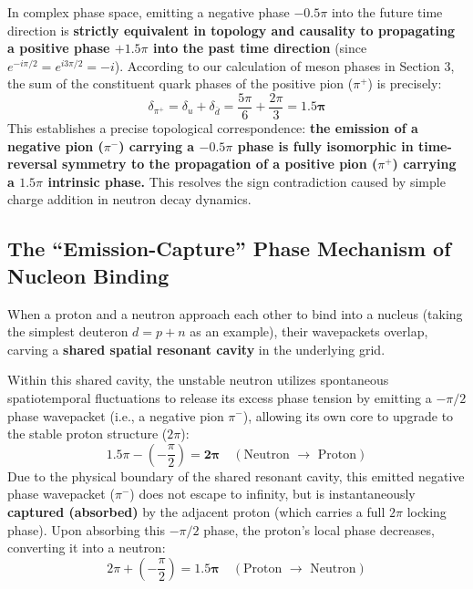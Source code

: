 \documentclass[12pt, a4paper]{article}
\begin{document}
In complex phase space, emitting a negative phase $-0.5\pi$ into the future time direction is \textbf{strictly equivalent in topology and causality to propagating a positive phase $+1.5\pi$ into the past time direction} (since $e^{-i\pi/2} = e^{i3\pi/2} = -i$). According to our calculation of meson phases in Section 3, the sum of the constituent quark phases of the positive pion ($\pi^+$) is precisely:
\begin{equation}
\delta_{\pi^+} = \delta_u + \delta_{\bar{d}} = \frac{5\pi}{6} + \frac{2\pi}{3} = \mathbf{1.5\pi} \label{eq:pion_phase_match}
\end{equation}
This establishes a precise topological correspondence: \textbf{the emission of a negative pion ($\pi^-$) carrying a $-0.5\pi$ phase is fully isomorphic in time-reversal symmetry to the propagation of a positive pion ($\pi^+$) carrying a $1.5\pi$ intrinsic phase.} This resolves the sign contradiction caused by simple charge addition in neutron decay dynamics.

\subsection{The ``Emission-Capture'' Phase Mechanism of Nucleon Binding}

When a proton and a neutron approach each other to bind into a nucleus (taking the simplest deuteron $d = p + n$ as an example), their wavepackets overlap, carving a \textbf{shared spatial resonant cavity} in the underlying grid.

Within this shared cavity, the unstable neutron utilizes spontaneous spatiotemporal fluctuations to release its excess phase tension by emitting a $-\pi/2$ phase wavepacket (i.e., a negative pion $\pi^-$), allowing its own core to upgrade to the stable proton structure ($2\pi$):
\begin{equation}
1.5\pi - \left( -\frac{\pi}{2} \right) = \mathbf{2\pi} \quad (\text{Neutron } \to \text{ Proton}) \label{eq:n_to_p}
\end{equation}
Due to the physical boundary of the shared resonant cavity, this emitted negative phase wavepacket ($\pi^-$) does not escape to infinity, but is instantaneously \textbf{captured (absorbed)} by the adjacent proton (which carries a full $2\pi$ locking phase). Upon absorbing this $-\pi/2$ phase, the proton's local phase decreases, converting it into a neutron:
\begin{equation}
2\pi + \left( -\frac{\pi}{2} \right) = \mathbf{1.5\pi} \quad (\text{Proton } \to \text{ Neutron}) \label{eq:p_to_n}
\end{equation}
\end{document}
